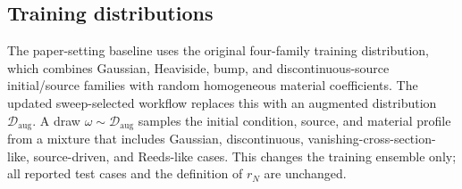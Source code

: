 \documentclass[10pt]{article}
\begin{document}
\subsection{Training distributions}
The paper-setting baseline uses the original four-family training distribution,
which combines Gaussian, Heaviside, bump, and discontinuous-source initial/source
families with random homogeneous material coefficients.  The updated
sweep-selected workflow replaces this with an augmented distribution
\(\mathcal{D}_{\mathrm{aug}}\).  A draw
\(\omega\sim\mathcal{D}_{\mathrm{aug}}\) samples the initial condition, source,
and material profile from a mixture that includes Gaussian, discontinuous,
vanishing-cross-section-like, source-driven, and Reeds-like cases.  This changes
the training ensemble only; all reported test cases and the definition of
\(r_N\) are unchanged.
\end{document}
